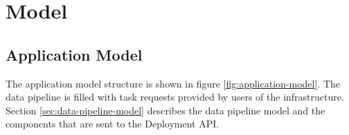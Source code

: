 \chapter{Model} %
\label{ch:model-methodology}


    \section{Application Model}
    \label{sec:application-model}






    The application model structure is shown in figure \ref{fig:application-model}.
    The data pipeline is filled with task requests provided by users of the infrastructure.
    Section \ref{sec:data-pipeline-model} describes the data pipeline model and the components that are sent to the Deployment API. 



